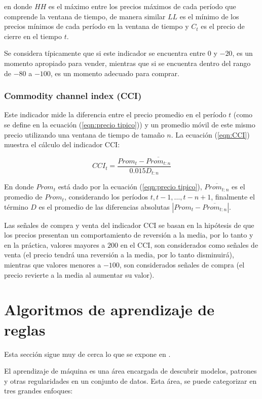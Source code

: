 \documentclass[12pt]{report}
\theoremstyle{break}
\theoremstyle{break}
\begin{document}
en donde $HH$ es el máximo entre los precios máximos de cada período que comprende la ventana de tiempo, de manera similar $LL$ es el mínimo de los precios mínimos de cada período en la ventana de tiempo y $C_t$ es el precio de cierre en el tiempo $t$.

Se considera típicamente que si este indicador se encuentra entre $0$ y $-20$, es un momento apropiado para vender, mientras que si se encuentra dentro del rango de $-80$ a $-100$, es un momento adecuado para comprar.

\subsubsection{Commodity channel index (CCI)}
\label{subsubseccion:cci}
Este indicador mide la diferencia entre el precio promedio en el período $t$ (como se define en la ecuación (\ref{eqn:precio tipico})) y un promedio móvil de este mismo precio utilizando una ventana de tiempo de tamaño $n$. La ecuación (\ref{eqn:CCI}) muestra el cálculo del indicador CCI:

\begin{equation} \label{eqn:CCI}
CCI_t = \dfrac{ Prom_t - \overline{Prom_{t:n}} }{ 0.015 D_{t:n}}
\end{equation}

En donde $Prom_t$ está dado por la ecuación (\ref{eqn:precio tipico}), $\overline{Prom_{t:n}}$ es el promedio de $Prom_t$, considerando los períodos $t, t-1, \ldots, t-n +1$, finalmente el término $D$ es el promedio de las diferencias absolutas $\left|Prom_t - \overline{Prom_{t:n}}  \right|$.

Las señales de compra y venta del indicador CCI se basan en la hipótesis de que los precios presentan un comportamiento de reversión a la media, por lo tanto y en la práctica, valores mayores a $200$ en el CCI, son considerados como señales de venta (el precio tendrá una reversión a la media, por lo tanto disminuirá), mientras que valores menores a $-100$, son considerados señales de compra (el precio revierte a la media al aumentar su valor).

\section{Algoritmos de aprendizaje de reglas}
\label{seccion:algoritmos-aprendizaje-reglas}
Esta sección sigue muy de cerca lo que se expone en \cite{foundations-rule}.

El aprendizaje de máquina es una área encargada de descubrir modelos, patrones y otras regularidades en un conjunto de datos. Esta área, se puede categorizar en tres grandes enfoques:
\end{document}

